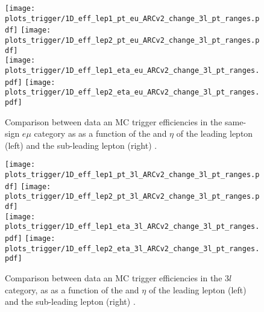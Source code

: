 \begin{figure}[htp]
\centering
\texttt{[image: plots\_trigger/1D\_eff\_lep1\_pt\_eu\_ARCv2\_change\_3l\_pt\_ranges.pdf]}
\texttt{[image: plots\_trigger/1D\_eff\_lep2\_pt\_eu\_ARCv2\_change\_3l\_pt\_ranges.pdf]} \\
\texttt{[image: plots\_trigger/1D\_eff\_lep1\_eta\_eu\_ARCv2\_change\_3l\_pt\_ranges.pdf]}
\texttt{[image: plots\_trigger/1D\_eff\_lep2\_eta\_eu\_ARCv2\_change\_3l\_pt\_ranges.pdf]}
\caption[Trigger efficiency for the $e\mu$ category]{Comparison between data an MC trigger efficiencies in the same-sign $e\mu$ category as as a function of the \pt and $\eta$ of the leading lepton (left) and the sub-leading lepton (right) \cite{CMS_AN_2017-029}.}
\label{fig:trigeffsemu}
\end{figure}


\begin{figure}[htp]
\centering
\texttt{[image: plots\_trigger/1D\_eff\_lep1\_pt\_3l\_ARCv2\_change\_3l\_pt\_ranges.pdf]}
\texttt{[image: plots\_trigger/1D\_eff\_lep2\_pt\_3l\_ARCv2\_change\_3l\_pt\_ranges.pdf]} \\
\texttt{[image: plots\_trigger/1D\_eff\_lep1\_eta\_3l\_ARCv2\_change\_3l\_pt\_ranges.pdf]}
\texttt{[image: plots\_trigger/1D\_eff\_lep2\_eta\_3l\_ARCv2\_change\_3l\_pt\_ranges.pdf]}
\caption[Trigger efficiency for the $3l$ category]{Comparison between data an MC trigger efficiencies in the $3l$ category, as as a function of the \pt and $\eta$ of the leading lepton (left) and the sub-leading lepton (right) \cite{CMS_AN_2017-029}.}
\label{fig:trigeffs3l}
\end{figure}

